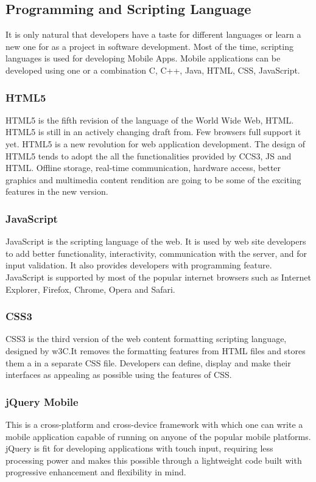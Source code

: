 \subsection{Programming and Scripting Language}
It is only natural that developers have a taste for different languages or
learn a new one for as a project in software development. Most of the time,
scripting languages is used for developing Mobile Apps. Mobile applications
can be developed using one or a combination C, C++, Java, HTML, CSS, JavaScript.

\subsubsection{HTML5}
HTML5 is the fifth revision of the language of the World Wide Web, HTML.
 HTML5 is still in an actively changing draft from. Few browsers full
 support it yet. HTML5 is a new revolution for web application development.
 The design of HTML5 tends to adopt the all the functionalities provided
 by CCS3, JS and HTML.  Offline storage, real-time communication, hardware
 access, better graphics and multimedia content rendition are going to be
 some of the exciting features in the new version.

 \subsubsection{JavaScript}
 JavaScript is the scripting language of the web.
 It is used by web site developers to add better
 functionality, interactivity, communication with the
 server, and for input validation. It also provides developers
 with programming feature. JavaScript is supported by most of
 the popular internet browsers such as Internet Explorer, Firefox,
 Chrome, Opera and Safari.

 \subsubsection{CSS3}
 CSS3 is the third version of the web content formatting scripting language,
 designed by w3C.It removes the formatting features from HTML files and
 stores them a in a separate CSS file.
Developers can define, display and make their interfaces as appealing
as possible using the features of CSS.

\subsubsection{jQuery Mobile}
This is a cross-platform and cross-device framework with which one can write
a mobile application capable of running on anyone of the popular mobile platforms.
jQuery is fit for developing applications with touch input, requiring
less processing power and  makes this possible through a lightweight code
built with progressive enhancement and flexibility in mind.


